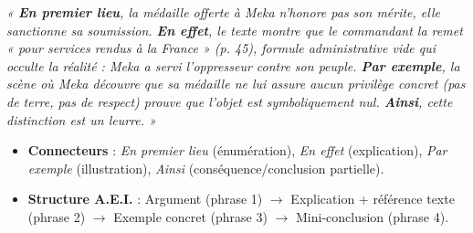\documentclass[11pt]{article}
\begin{document}
\begin{exemplebox}
\textit{« \textbf{En premier lieu}, la médaille offerte à Meka n'honore pas son mérite, elle sanctionne sa soumission. \textbf{En effet}, le texte montre que le commandant la remet « pour services rendus à la France » (p. 45), formule administrative vide qui occulte la réalité : Meka a servi l'oppresseur contre son peuple. \textbf{Par exemple}, la scène où Meka découvre que sa médaille ne lui assure aucun privilège concret (pas de terre, pas de respect) prouve que l'objet est symboliquement nul. \textbf{Ainsi}, cette distinction est un leurre. »}

\begin{itemize}
    \item \textbf{Connecteurs} : \emph{En premier lieu} (énumération), \emph{En effet} (explication), \emph{Par exemple} (illustration), \emph{Ainsi} (conséquence/conclusion partielle).
    \item \textbf{Structure A.E.I.} : Argument (phrase 1) $\rightarrow$ Explication + référence texte (phrase 2) $\rightarrow$ Exemple concret (phrase 3) $\rightarrow$ Mini-conclusion (phrase 4).
\end{itemize}
\end{exemplebox}
\end{document}
